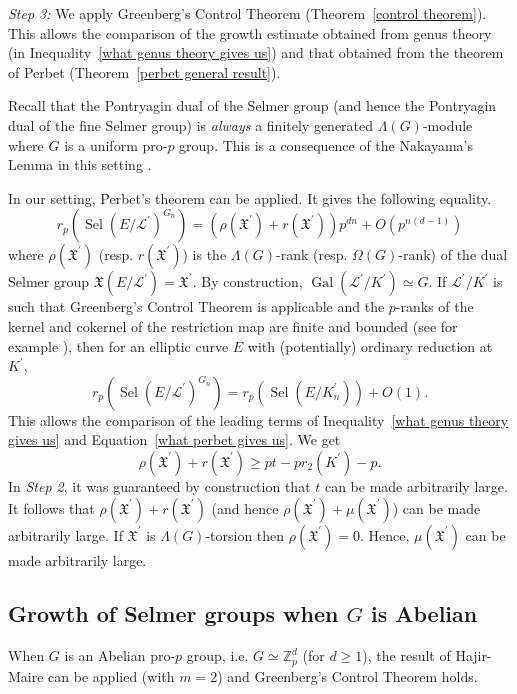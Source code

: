 \documentclass{amsart}
\DeclareMathOperator{\Gal}{Gal}
\DeclareMathOperator{\Sel}{Sel}
\newcommand{\ZZ}{\mathbb Z}
\newcommand{\Linf}{\mathcal{L}}
\newcommand{\X}{\mathfrak X}
\theoremstyle{definition}
\theoremstyle{remark}
\begin{document}
\noindent \textit{Step 3:} We apply Greenberg's Control Theorem (Theorem~\ref{control theorem}). 
This allows the comparison of the growth estimate obtained from genus theory (in Inequality~\ref{what genus theory gives us}) and that obtained from the theorem of Perbet (Theorem~\ref{perbet general result}).

Recall that the Pontryagin dual of the Selmer group (and hence the Pontryagin dual of the fine Selmer group) is \textit{always} a finitely generated $\Lambda(G)$-module where $G$ is a uniform pro-$p$ group.
This is a consequence of the Nakayama's Lemma in this setting \cite{BH97}.

In our setting, Perbet's theorem can be applied.
It gives the following equality.
\begin{equation}
\label{what perbet gives us}
r_p \left( \Sel\left( E/\Linf^\prime\right)^{G_n}\right) = \left( \rho(\X^\prime) + r(\X^\prime)\right)p^{dn} + O(p^{n(d-1)})
\end{equation}
where $\rho(\X^\prime)$ (resp. $r(\X^\prime)$) is the $\Lambda(G)$-rank (resp. $\Omega(G)$-rank) of the dual Selmer group $\X(E/\Linf^\prime)=\X^\prime$.
By construction, $\Gal(\Linf^\prime/K^\prime)\simeq G$.
If $\Linf^\prime/K^\prime$ is such that Greenberg's Control Theorem is applicable and the $p$-ranks of the kernel and cokernel of the restriction map are finite and bounded (see for example \cite[Proposition 3.4]{Gre03}), then for an elliptic curve $E$ with (potentially) ordinary reduction at $K^\prime$,
\[
r_p \left( \Sel\left( E/\Linf^\prime\right)^{G_n}\right) = r_p \left( \Sel\left( E/K_n^\prime\right)\right) + O(1).
\]
This allows the comparison of the leading terms of Inequality~\ref{what genus theory gives us} and Equation~\ref{what perbet gives us}.
We get
\[
\rho(\X^\prime) + r(\X^\prime) \geq pt - p r_2(K^\prime) -p.
\]
In \textit{Step 2}, it was guaranteed by construction that $t$ can be made arbitrarily large.
It follows that $\rho(\X^\prime) + r(\X^\prime)$ (and hence $\rho(\X^\prime) + \mu(\X^\prime)$) can be made arbitrarily large.
If $\X^\prime$ is $\Lambda(G)$-torsion then $\rho(\X^\prime)=0$. 
Hence, $\mu(\X^\prime)$ can be made arbitrarily large.

\subsection{Growth of Selmer groups when $G$ is Abelian}
When $G$ is an Abelian pro-$p$ group, i.e. $G\simeq \ZZ_p^d$ (for $d\geq 1$), the result of Hajir-Maire can be applied (with $m=2$) and Greenberg's Control Theorem holds.
\end{document}
